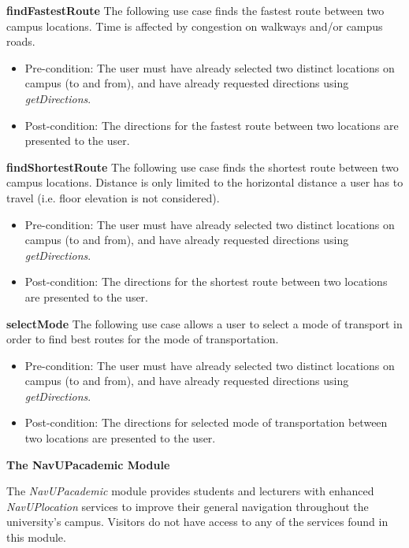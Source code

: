 \documentclass[12pt,a4paper]{article}
\begin{document}
		    \textbf{findFastestRoute}
			The following use case finds the fastest route between two campus locations. Time is affected by congestion on 				    walkways and/or campus roads.

			\begin{itemize}
			\item Pre-condition: The user must have already selected two distinct locations on campus (to and from), and have 					  already requested directions using \textit{getDirections}.
			\item Post-condition: The directions for the fastest route between two locations are presented to the user.
			\end{itemize}

			\textbf{findShortestRoute}
			The following use case finds the shortest route between two campus locations. Distance is only limited to the 				    horizontal distance a user has to travel (i.e. floor elevation is not considered).

			\begin{itemize}
			\item Pre-condition: The user must have already selected two distinct locations on campus (to and from), and have 					  already requested directions using \textit{getDirections}.
			\item Post-condition: The directions for the shortest route between two locations are presented to the user.
			\end{itemize}

			\textbf{selectMode}
			The following use case allows a user to select a mode of transport in order to find best routes for the mode of 		        transportation.

			\begin{itemize}
			\item Pre-condition: The user must have already selected two distinct locations on campus (to and from), and have 					  already requested directions using \textit{getDirections}.
			\item Post-condition: The directions for selected mode of transportation between two locations are presented to     				  the user.
			\end{itemize}

	    \textbf{The NavUPacademic Module} \newline

	    The \textit{NavUPacademic} module provides students and lecturers with enhanced \textit{NavUPlocation} services to 				improve their general navigation throughout the university's campus. Visitors do not have access to any of the 				    services found in this module.
\end{document}
